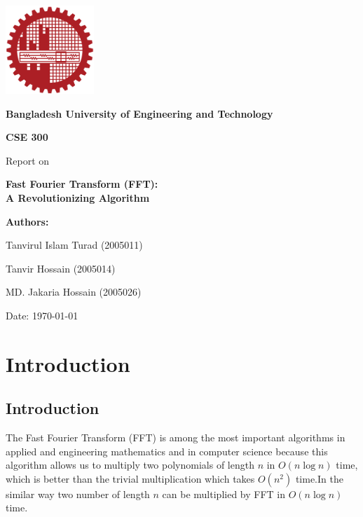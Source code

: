 \documentclass[28]{report}
\begin{document}
\begin{titlepage}
    \centering
    \vspace*{2cm}
    \includegraphics[width=0.25\textwidth]{images/buet.png}\\
    \vspace{1.5cm}
    {\Large \textbf{Bangladesh University of Engineering and Technology} \par}
    \vspace{2cm}
    {\LARGE \textbf{CSE 300} \par}
    \vspace{1cm}
    {\Large Report on \par}
    \vspace{0.5cm}
    {\LARGE \textbf{Fast Fourier Transform (FFT):\\[0.5em] A Revolutionizing Algorithm} \par}
    \vspace{1.5cm}
    {\large \textbf{Authors:} \par}
    \vspace{0.5cm}
    {\large Tanvirul Islam Turad (2005011) \par}
    {\large Tanvir Hossain (2005014) \par}
    {\large MD. Jakaria Hossain (2005026)\par}
    \vspace{2cm}
    {\large Date: \today \par}
\end{titlepage}

\tableofcontents
\newpage

\chapter{Introduction}
\section{Introduction}
The Fast Fourier Transform (FFT) is among the most important algorithms
in applied and engineering mathematics and in computer science because this algorithm allows us to multiply two polynomials of length 
$n$ in 
$O(n \log n)$ time, which is better than the trivial multiplication which takes 
$O(n^2)$ time.In the similar way two number of length $n$ can be multiplied by FFT in $O(n \log n)$ time. \linebreak 
\end{document}
